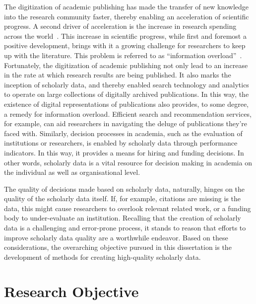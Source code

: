 The digitization of academic publishing has made the transfer of new knowledge into the research community faster, thereby enabling an acceleration of scientific progress. A second driver of acceleration is the increase in research spending across the world~\cite{CRS2022,OECD2023}.
This increase in scientific progress, while first and foremost a positive development, brings with it a growing challenge for researchers to keep up with the literature. This problem is referred to as ``information overload''~\cite{Landhuis2016}.
Fortunately, the digitization of academic publishing not only lead to %
an increase in the rate at which research results are being published. It also marks the inception of scholarly data, and thereby enabled search technology and analytics to operate on large collections of digitally archived publications.
In this way, the existence of digital representations of publications also provides, to some degree, a remedy for information overload. Efficient search and recommendation services, for example, can aid researchers in navigating the deluge of publications they're faced with.
Similarly, decision processes in academia, such as the evaluation of institutions or researchers, is enabled by scholarly data through performance indicators. In this way, it provides a means for hiring and funding decisions.
In other words, scholarly data is a vital resource for decision making in academia on the individual as well as organisational level.

The quality of decisions made based on scholarly data, naturally, hinges on the quality of the scholarly data itself. If, for example, citations are missing is the data, this might cause researchers to overlook relevant related work, or a funding body to under-evaluate an institution. Recalling that the creation of scholarly data is a challenging and error-prone process, it stands to reason that efforts to improve scholarly data quality are a worthwhile endeavor. Based on these considerations, the overarching objective pursued in this dissertation is the development of methods for creating high-quality scholarly data.


\section{Research Objective}\label{sec:intro-researchobj}

